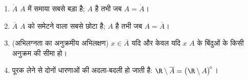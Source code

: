 \begin{proposition}[मुख्य गुणधर्म]\label{prop:b1:topology:closureprops}
\begin{enumerate}
  \item $\mathring A$ $A$ में समाया सबसे बड़ा  है; $A$  है
  तभी जब $A = \mathring A$।
  \item $\overline A$ $A$ को समेटने वाला सबसे छोटा  है; $A$
   है तभी जब $A = \overline A$।
  \item (अभिलग्नता का अनुक्रमीय अभिलक्षण) $x \in \overline A$ यदि और केवल
  यदि $x$ $A$ के बिंदुओं के किसी अनुक्रम की सीमा हो।
  \item पूरक लेने से दोनों धारणाओं की अदला-बदली हो जाती है: $\R \setminus
  \overline A = \bigl(\R \setminus A\bigr)^{\!\circ}$।
\end{enumerate}
\end{proposition}


